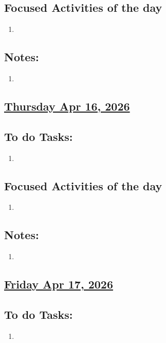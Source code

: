 \subsection*{Focused Activities of the day}
\begin{enumerate}[\ding{212}]  
    \item  
\end{enumerate}
\subsection*{Notes:}
\begin{enumerate}
    \item 
\end{enumerate}
\subsection*{\underline{Thursday Apr 16, 2026}}
\subsection*{To do Tasks:}
\begin{enumerate}
    \item 
\end{enumerate}
\subsection*{Focused Activities of the day}
\begin{enumerate}[\ding{212}]  
    \item 
\end{enumerate}
\subsection*{Notes:}
\begin{enumerate}
    \item  
\end{enumerate}
\subsection*{\underline{Friday Apr 17, 2026}}
\subsection*{To do Tasks:}
\begin{enumerate}
    \item 
\end{enumerate}
